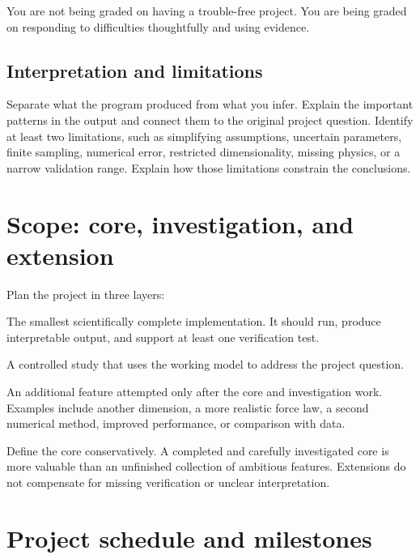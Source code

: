 \documentclass[11pt]{article}
\begin{document}
You are not being graded on having a trouble-free project. You are being graded
on responding to difficulties thoughtfully and using evidence.

\subsection{Interpretation and limitations}

Separate what the program produced from what you infer. Explain the important
patterns in the output and connect them to the original project question. Identify
at least two limitations, such as simplifying assumptions, uncertain parameters,
finite sampling, numerical error, restricted dimensionality, missing physics,
or a narrow validation range. Explain how those limitations constrain the
conclusions.

\newpage
\section{Scope: core, investigation, and extension}

Plan the project in three layers:

\begin{description}[style=nextline,leftmargin=1.5em,labelindent=0pt]
  \item[Core model -- required]
  The smallest scientifically complete implementation. It should run, produce
  interpretable output, and support at least one verification test.

  \item[Investigation -- required]
  A controlled study that uses the working model to address the project question.

  \item[Extension -- optional]
  An additional feature attempted only after the core and investigation work.
  Examples include another dimension, a more realistic force law, a second
  numerical method, improved performance, or comparison with data.
\end{description}

Define the core conservatively. A completed and carefully investigated core is
more valuable than an unfinished collection of ambitious features. Extensions
do not compensate for missing verification or unclear interpretation.

\section{Project schedule and milestones}
\end{document}

